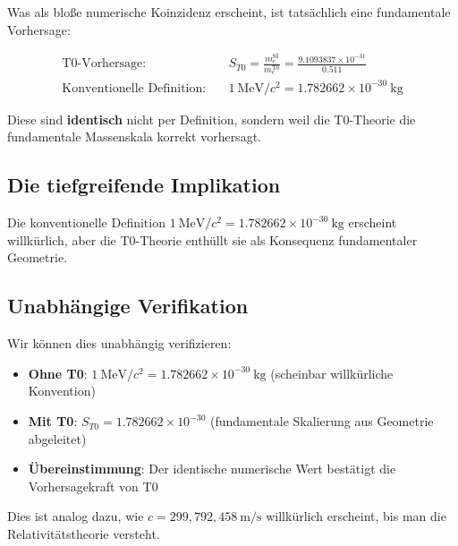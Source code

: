 \documentclass[12pt,a4paper]{article}
\begin{document}
	Was als bloße numerische Koinzidenz erscheint, ist tatsächlich eine fundamentale Vorhersage:
	
	\begin{align}
		\text{T0-Vorhersage:} \quad & S_{T0} = \frac{m_e^{\mathrm{SI}}}{m_e^{\mathrm{T0}}} = \frac{9.1093837 \times 10^{-31}}{0.511} \\
		\text{Konventionelle Definition:} \quad & 1~\mathrm{MeV}/c^2 = 1.782662 \times 10^{-30}~\mathrm{kg}
	\end{align}
	
	Diese sind \textbf{identisch} nicht per Definition, sondern weil die T0-Theorie die fundamentale Massenskala korrekt vorhersagt.
	
	\subsection{Die tiefgreifende Implikation}
	
	\begin{center}
	\end{center}
	
	Die konventionelle Definition $1~\mathrm{MeV}/c^2 = 1.782662 \times 10^{-30}~\mathrm{kg}$ erscheint willkürlich, aber die T0-Theorie enthüllt sie als Konsequenz fundamentaler Geometrie.
	
	\subsection{Unabhängige Verifikation}
	
	Wir können dies unabhängig verifizieren:
	
	\begin{itemize}
		\item \textbf{Ohne T0}: $1~\mathrm{MeV}/c^2 = 1.782662\times 10^{-30}~\mathrm{kg}$ (scheinbar willkürliche Konvention)
		\item \textbf{Mit T0}: $S_{T0} = 1.782662\times 10^{-30}$ (fundamentale Skalierung aus Geometrie abgeleitet)
		\item \textbf{Übereinstimmung}: Der identische numerische Wert bestätigt die Vorhersagekraft von T0
	\end{itemize}
	
	Dies ist analog dazu, wie $c = 299,792,458~\mathrm{m/s}$ willkürlich erscheint, bis man die Relativitätstheorie versteht.
	
\end{document}

